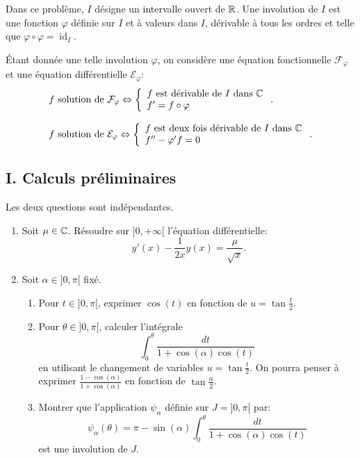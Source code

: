 Dans ce problème, $I$ désigne un intervalle ouvert de $\mathbb{R}$. Une involution de $I$ est une fonction $\varphi$ définie sur $I$ et à valeurs dans $I$, dérivable à tous les ordres et telle que $\varphi \circ \varphi = \operatorname{id}_{I}$. 

\'Etant donnée une telle involution $\varphi$, on considère une équation fonctionnelle $\mathcal{F}_{\varphi}$ et une équation différentielle $\mathcal{E}_{\varphi}$:
\[ 
\begin{array}{l}
f \text{ solution de } \mathcal{F}_{\varphi} \Leftrightarrow 
\left \lbrace
  \begin{array}{l}
    f \text{ est dérivable de } I \text{ dans } \mathbb{C}\\ 
    f' = f \circ \varphi
  \end{array}
\right. .\\ \\
f \text{ solution de } \mathcal{E}_{\varphi} \Leftrightarrow 
\left \lbrace
  \begin{array}{l}
    f \text{ est deux fois dérivable de } I \text{ dans } \mathbb{C}\\ 
    f'' - \varphi ' f = 0
  \end{array}
\right. .
\end{array}
\]


\subsection*{I. Calculs préliminaires}

Les deux questions sont indépendantes.
\begin{enumerate}
 \item Soit $\mu \in \mathbb{C}$. Résoudre sur $]0, +\infty[$ l'équation différentielle:
\[ y'(x) - \frac{1}{2x}y(x) = \frac{\mu}{\sqrt{x}}.\]


 \item Soit $\alpha \in ]0, \pi[$ fixé. 
 \begin{enumerate}
  \item Pour $t \in ]0, \pi[$, exprimer $\cos(t)$ en fonction de $u = \tan \frac{t}{2}$.
  \item Pour $\theta \in ]0, \pi[$, calculer l'intégrale
 \[ \int_{0}^{\theta}\frac{dt}{1 + \cos(\alpha)\cos(t)}\]
 en utilisant le changement de variables $u = \tan \frac{t}{2}$. On pourra penser à exprimer $\frac{1-\cos(\alpha)}{1+\cos(\alpha)}$ en fonction de $\tan \frac{\alpha}{2}$.
\item Montrer que l'application $\psi_{\alpha}$ définie sur $J = ]0, \pi [$ par:
\[ \psi_{\alpha}(\theta) = \pi - \sin(\alpha)\int_{0}^{\theta}\frac{dt}{1 + \cos(\alpha)\cos(t)}\]
est une involution de $J$.
\end{enumerate}
\end{enumerate}


